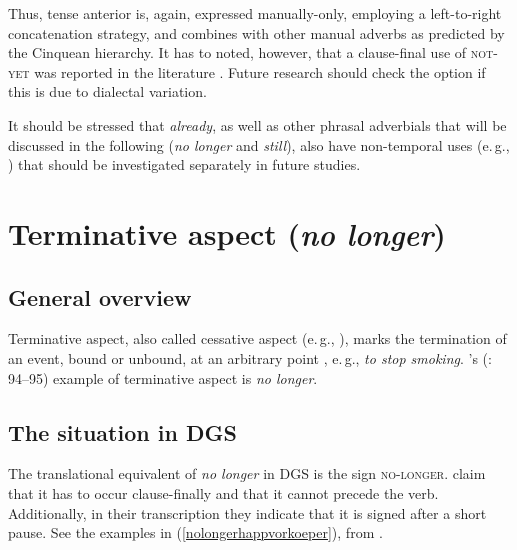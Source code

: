 \noindent Thus, tense anterior is, again, expressed manually-only, employing a left-to-right concatenation strategy, and combines with other manual adverbs as predicted by the Cinquean hierarchy. It has to noted, however, that a clause-final use of \textsc{not-yet} was reported in the literature \citep[185]{papaspyrou2008grammatik}. Future research should check the option if this is due to dialectal variation.

It should be stressed that \textit{already}, as well as other phrasal adverbials that will be discussed in the following (\textit{no longer} and \textit{still}), also have non-temporal uses (e.\,g., \citealt{konig1977temporal, lobner1989germanschon, van1998phasal}) that should be investigated separately in future studies.


\section{Terminative aspect (\textit{no longer})}
\subsection{General overview}
Terminative aspect, also called cessative aspect (e.\,g., \citealt{binnick1991time}), marks the termination of an event, bound or unbound, at an arbitrary point \citep[70]{cinque2006restructuring}, e.\,g., \textit{to stop smoking}. \citeauthor{cinque1999adverbs}'s (\citeyear{cinque1999adverbs}: 94--95) example of terminative aspect is \textit{no longer}. 

\subsection{The situation in DGS}
The translational equivalent of \textit{no longer} in DGS is the sign \textsc{no-longer}. \citet[377]{happ2014vork} claim that it has to occur clause-finally and that it cannot precede the verb. Additionally, in their transcription they indicate that it is signed after a short pause. See the examples in (\ref{nolongerhappvorkoeper}), from \citet[377]{happ2014vork}. 


\begin{exe}
\ex\label{nolongerhappvorkoeper}\begin{xlist} 
\end{xlist}

\end{exe} 



